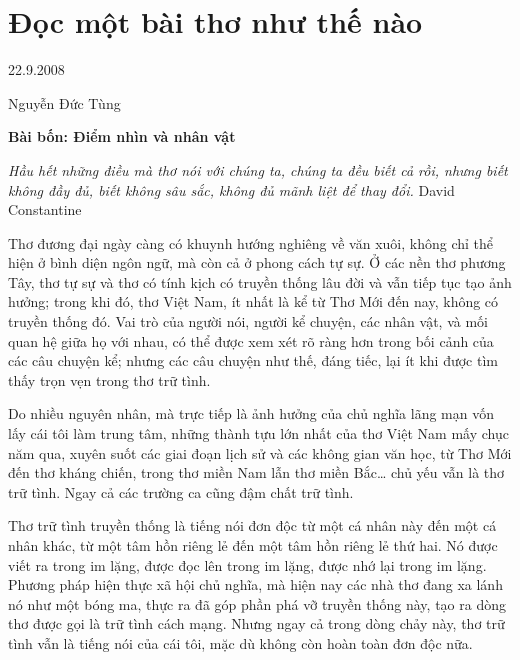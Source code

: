 \documentclass[../main.tex]{subfiles}
\begin{document}
\chapter{Đọc một bài thơ như thế nào}

\begin{metadata}

\begin{flushright}22.9.2008\end{flushright}

Nguyễn Đức Tùng



\end{metadata}

\begin{multicols}{2}

\textbf{Bài bốn: Điểm nhìn và nhân vật} 
 
\textit{Hầu hết những điều mà thơ nói với chúng ta, chúng ta đều biết cả rồi, nhưng biết không đầy đủ, biết không sâu sắc, không đủ mãnh liệt để thay đổi.} 
David Constantine 
 
Thơ đương đại ngày càng có khuynh hướng nghiêng về văn xuôi, không chỉ thể hiện ở bình diện ngôn ngữ, mà còn cả ở phong cách tự sự. Ở các nền thơ phương Tây, thơ tự sự và thơ có tính kịch có truyền thống lâu đời và vẫn tiếp tục tạo ảnh hưởng; trong khi đó, thơ Việt Nam, ít nhất là kể từ Thơ Mới đến nay, không có truyền thống đó. Vai trò của người nói, người kể chuyện, các nhân vật, và mối quan hệ giữa họ với nhau, có thể được xem xét rõ ràng hơn trong bối cảnh của các câu chuyện kể; nhưng các câu chuyện như thế, đáng tiếc, lại ít khi được tìm thấy trọn vẹn trong thơ trữ tình.  
 
Do nhiều nguyên nhân, mà trực tiếp là ảnh hưởng của chủ nghĩa lãng mạn vốn lấy cái tôi làm trung tâm, những thành tựu lớn nhất của thơ Việt Nam mấy chục năm qua, xuyên suốt các giai đoạn lịch sử và các không gian văn học, từ Thơ Mới đến thơ kháng chiến, trong thơ miền Nam lẫn thơ miền Bắc… chủ yếu vẫn là thơ trữ tình. Ngay cả các trường ca cũng đậm chất trữ tình. 
 
Thơ trữ tình truyền thống là tiếng nói đơn độc từ một cá nhân này đến một cá nhân khác, từ một tâm hồn riêng lẻ đến một tâm hồn riêng lẻ thứ hai. Nó được viết ra trong im lặng, được đọc lên trong im lặng, được nhớ lại trong im lặng. Phương pháp hiện thực xã hội chủ nghĩa, mà hiện nay các nhà thơ đang xa lánh nó như một bóng ma, thực ra đã góp phần phá vỡ truyền thống này, tạo ra dòng thơ được gọi là trữ tình cách mạng. Nhưng ngay cả trong dòng chảy này, thơ trữ tình vẫn là tiếng nói của cái tôi, mặc dù không còn hoàn toàn đơn độc nữa.  
 

\end{multicols}
\end{document}
